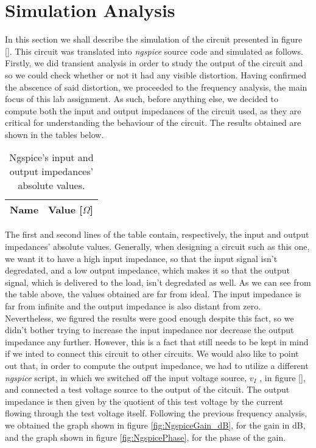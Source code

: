 \clearpage

\section{Simulation Analysis}
\label{sec:simulation}
\vspace{-0.5cm}
In this section we shall describe the simulation of the circuit presented in figure \ref{}. This circuit was translated into \emph{ngspice}
source code and simulated as follows.
Firstly, we did transient analysis in order to study the output of the circuit and so we could check whether or
not it had any visible distortion. Having confirmed the abscence of said distortion, we proceeded to the frequency analysis,
the main focus of this lab assignment.
As such, before anything else, we decided to compute both the input and output impedances of the circuit used, as they are critical for
understanding the behaviour of the circuit. The results obtained are shown in the tables below.

\vspace{-0.65cm}
\begin{table}[h]\label{tab:SimZ}
    \centering
    \begin{tabular}{|c|c|}
      \hline
      {\bf Name} & {\bf Value [$\Omega$]} \\ \hline
      
    \end{tabular}
    \vspace{-2.5mm}
    \caption{Ngspice's input and output impedances' absolute values.}
\end{table}

\vspace{-0.45cm}
The first and second lines of the table contain, respectively, the input and output impedances' absolute values.
Generally, when designing a circuit such as this one, we want it to have a high input impedance,
so that the input signal isn’t degredated, and a low output impedance, which makes it so that the
output signal, which is delivered to the load, isn’t degredated as well. As we
can see from the table above, the values obtained are far from ideal. The input impedance is far from infinite and the output impedance is also
distant from zero. Nevertheless, we figured the results were good enough despite this fact, so we didn't bother trying to increase the input
impedance nor decrease the output impedance any further. However, this is a fact that still needs to be kept in mind if we inted to connect this circuit
to other circuits. We would also like to point out that, in order to compute the output impedance, we had to utilize a different \emph{ngspice} 
script, in which we switched off the input voltage source, $v_{I}$ , in figure \ref{}, and connected a test voltage source to
the output of the citcuit. The output impedance is then given by the quotient
of this test voltage by the current flowing through the test voltage itself.
Following the previous frequency analysis, we obtained the graph shown in figure \ref{fig:NgspiceGain_dB}, for the
gain in dB, and the graph shown in figure \ref{fig:NgspicePhase}, for the phase of the gain.


